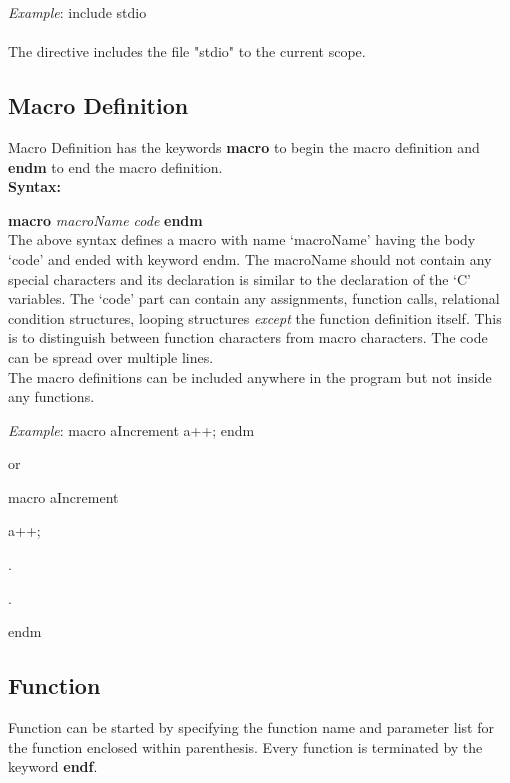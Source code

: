 \documentclass[12pt, oneside, a4paper]{article}
\begin{document}
\emph{Example}: include stdio\\\\
The directive includes the file "stdio" to the current scope.

\subsection{Macro Definition}
Macro Definition has the keywords \textbf{macro} to begin the macro definition and \textbf{endm} to end the macro definition.\\

\hspace{.5in} \textbf{Syntax:}
	
\hspace{1in}  \textbf{macro} \emph{macroName code} \textbf{endm}\\

The above syntax defines a macro with name `macroName' having the body `code' and ended with keyword endm.
The macroName should not contain any special characters and its declaration is similar to the declaration of the `C' variables.
The `code' part can contain any assignments, function calls, relational condition structures, looping structures \emph{except} the function definition itself. This is to distinguish between function characters from macro characters.  The code can be spread over multiple lines.\\

The macro definitions can be included anywhere in the program but not inside any functions.

\emph{Example}: macro aIncrement a++; endm 

\hspace{1in} or

\hspace{.75in}macro aIncrement

\hspace{1in}a++;

\hspace{1.15in} .

\hspace{1.15in} .

\hspace{.75in}endm


\subsection{Function}
Function can be started by specifying the function name and parameter list for the function enclosed within parenthesis.  Every function is terminated by the keyword \textbf{endf}.\\
\end{document}
